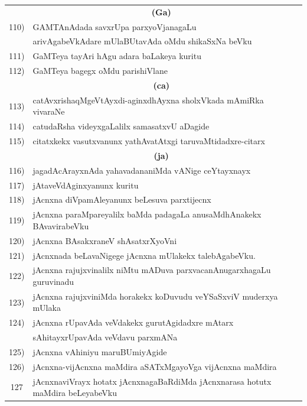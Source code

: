 \begin{longtable}{@{}cp{7.4cm}r}
     & \multicolumn{1}{c}{\textbf{(Ga)}} & \\[0.3cm]
110) &  GAMTAnAdada savxrUpa parxyoVjanagaLu & \\
     &  arivAgabeVkAdare mUlaBUtavAda oMdu shikaSxNa beVku &  \pageref{page169a}\\
111) & GaMTeya tayAri hAgu adara baLakeya kuritu & \pageref{page148}\\
112) & GaMTeya bagegx oMdu parishiVlane & \pageref{page170a}\\[0.3cm]
     & \multicolumn{1}{c}{\textbf{(ca)}} & \\[0.3cm]    
113) & catAvxrishaqMgeVtAyxdi-aginxdhAyxna sholxVkada mAmiRka vivaraNe &  \pageref{page209a}\\
114) & catudaRsha videyxgaLalilx samasatxvU aDagide & \pageref{page197}\\
115) & citatxkekx vasutxvanunx yathAvatAtxgi taruvaMtidadxre-citarx & \pageref{page200a}\\[0.3cm]
     &  \multicolumn{1}{c}{\textbf{(ja)}}  & \\[0.3cm]
116) & jagadAcArayxnAda yahavadananiMda vANige ceYtayxnayx &   \pageref{page128a}\\
117) & jAtaveVdAginxyanunx kuritu & \pageref{page212}\\
118) & jAcnxna diVpamAleyanunx beLesuva parxtijecnx &   \pageref{page81}\\
119) & jAcnxna paraMpareyalilx baMda padagaLa anusaMdhAnakekx BAvavirabeVku & \pageref{page140}\\
120) & jAcnxna BAsakxraneV shAsatxrXyoVni & \pageref{page168}\\
121) & jAcnxnada beLavaNigege jAcnxna mUlakekx talebAgabeVku. & \pageref{page68}\\
122) & jAcnxna rajujxvinalilx niMtu mADuva parxvacanAnugarxhagaLu guruvinadu & \pageref{page82}\\ 
123) & jAcnxna rajujxviniMda horakekx koDuvudu veYSaSxviV muderxya mUlaka & \pageref{page83a}\\
124) & jAcnxna rUpavAda veVdakekx gurutAgidadxre mAtarx & \\
     & sAhitayxrUpavAda veVdavu parxmANa  & \pageref{page137}\\
125) & jAcnxna vAhiniyu maruBUmiyAgide & \pageref{page110c}\\
126) & jAcnxna-vijAcnxna maMdira aSATxMgayoVga vijAcnxna maMdira & \pageref{page73a}\\
127  & jAcnxnaviVrayx hotatx jAcnxnagaBaRdiMda jAcnxnarasa hotutx maMdira beLeyabeVku & \pageref{page79b}\\ 

\end{longtable}
